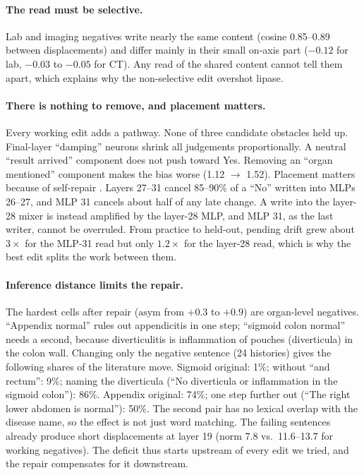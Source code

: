 \documentclass[10pt]{article}
\newcommand{\asym}{\mathrm{asym}}
\begin{document}
\paragraph{The read must be selective.} Lab and imaging negatives write nearly the same content (cosine 0.85--0.89 between displacements) and differ mainly in their small on-axis part ($-0.12$ for lab, $-0.03$ to $-0.05$ for CT). Any read of the shared content cannot tell them apart, which explains why the non-selective edit overshot lipase.

\paragraph{There is nothing to remove, and placement matters.} Every working edit adds a pathway. None of three candidate obstacles held up. Final-layer ``damping'' neurons shrink all judgements proportionally. A neutral ``result arrived'' component does not push toward Yes. Removing an ``organ mentioned'' component makes the bias worse (1.12 $\to$ 1.52). Placement matters because of self-repair \citep{mcgrath2023hydra}. Layers 27--31 cancel 85--90\% of a ``No'' written into MLPs 26--27, and MLP 31 cancels about half of any late change. A write into the layer-28 mixer is instead amplified by the layer-28 MLP, and MLP 31, as the last writer, cannot be overruled. From practice to held-out, pending drift grew about $3\times$ for the MLP-31 read but only $1.2\times$ for the layer-28 read, which is why the best edit splits the work between them.

\paragraph{Inference distance limits the repair.} The hardest cells after repair ($\asym$ from $+0.3$ to $+0.9$) are organ-level negatives. ``Appendix normal'' rules out appendicitis in one step; ``sigmoid colon normal'' needs a second, because diverticulitis is inflammation of pouches (diverticula) in the colon wall. Changing only the negative sentence (24 histories) gives the following shares of the literature move. Sigmoid original: 1\%; without ``and rectum'': 9\%; naming the diverticula (``No diverticula or inflammation in the sigmoid colon''): 86\%. Appendix original: 74\%; one step further out (``The right lower abdomen is normal''): 50\%. The second pair has no lexical overlap with the disease name, so the effect is not just word matching. The failing sentences already produce short displacements at layer 19 (norm 7.8 vs.\ 11.6--13.7 for working negatives). The deficit thus starts upstream of every edit we tried, and the repair compensates for it downstream.
\end{document}
